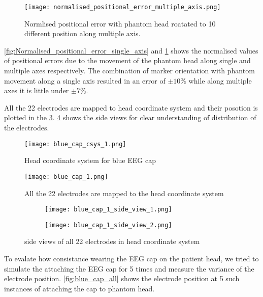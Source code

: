 \begin{figure}[hbt!]
	\centering
	\texttt{[image: normalised\_positional\_error\_multiple\_axis.png]}
	\caption{Normlised positional error with phantom head roatated to 10 different position along multiple axis.}  
	\label{fig:Normalised_positional_error_multiple_axis}
\end{figure}

\cref{fig:Normalised_positional_error_single_axis} and \cref{fig:Normalised_positional_error_multiple_axis} shows the normalised values of positional errors due to the movement of the phantom head along single and multiple axes respectively. The combination of marker orientation with phantom movement along a single axis resulted in an error of $\pm10\%$ while along multiple axes it is little under $\pm7\%$. 



All the 22 electrodes are mapped to head coordinate system and their posotion is plotted in the \cref{fig:electrodes_blue_cap_1}. \cref{fig:electrodes_blue_cap_1_side_view} shows the side views for clear understanding of distribution of the electrodes.

\begin{figure}[hbt!]
	\centering
	\texttt{[image: blue\_cap\_csys\_1.png]}
	\caption{Head coordinate system for blue EEG cap} 
	\label{fig:blue_cap_csys}
\end{figure}

\begin{figure}[hbt!]
	\centering
	\texttt{[image: blue\_cap\_1.png]}
	\caption{All the 22 electrodes are mapped to the head coordinate system} 
	\label{fig:electrodes_blue_cap_1}
\end{figure}

\begin{figure}[hbt!]
	\centering
	\begin{subfigure}{0.49\textwidth}
		\texttt{[image: blue\_cap\_1\_side\_view\_1.png]}	
	\end{subfigure}
	\hfill
	\begin{subfigure}{0.49\textwidth}
		\texttt{[image: blue\_cap\_1\_side\_view\_2.png]}	
	\end{subfigure}
	\caption{side views of all 22 electrodes in head coordinate system} 
	\label{fig:electrodes_blue_cap_1_side_view}
\end{figure} 

To evalate how consistance wearing the EEG cap on the patient head, we tried to simulate the attaching the EEG cap for 5 times and measure the variance of the electrode position. \cref{fig:blue_cap_all} shows the electrode position at 5 such instances of attaching the cap to phantom head.

